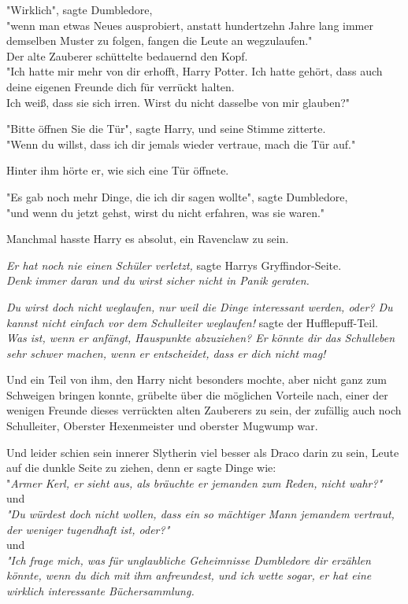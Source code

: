 {"Wirklich", sagte Dumbledore,\\ "wenn man etwas Neues ausprobiert, anstatt hundertzehn Jahre lang immer demselben Muster zu folgen, fangen die Leute an wegzulaufen."\\ Der alte Zauberer schüttelte bedauernd den Kopf.\\ "Ich hatte mir mehr von dir erhofft, Harry Potter. Ich hatte gehört, dass auch deine eigenen Freunde dich für verrückt halten.\\ Ich weiß, dass sie sich irren. Wirst du nicht dasselbe von mir glauben?"

"Bitte öffnen Sie die Tür", sagte Harry, und seine Stimme zitterte.\\ "Wenn du willst, dass ich dir jemals wieder vertraue, mach die Tür auf."

Hinter ihm hörte er, wie sich eine Tür öffnete.

"Es gab noch mehr Dinge, die ich dir sagen wollte", sagte Dumbledore,\\ "und wenn du jetzt gehst, wirst du nicht erfahren, was sie waren."

Manchmal hasste Harry es absolut, ein Ravenclaw zu sein.

\emph{Er hat noch nie einen Schüler verletzt,} sagte Harrys Gryffindor-Seite.\\ \emph{Denk immer daran und du wirst sicher nicht in Panik geraten.}

\emph{Du wirst doch nicht weglaufen, nur weil die Dinge interessant werden, oder? Du kannst nicht einfach vor dem Schulleiter weglaufen!} sagte der Hufflepuff-Teil.\\ \emph{Was ist, wenn er anfängt, Hauspunkte abzuziehen? Er könnte dir das Schulleben sehr schwer machen, wenn er entscheidet, dass er dich nicht mag!}

Und ein Teil von ihm, den Harry nicht besonders mochte, aber nicht ganz zum Schweigen bringen konnte, grübelte über die möglichen Vorteile nach, einer der wenigen Freunde dieses verrückten alten Zauberers zu sein, der zufällig auch noch Schulleiter, Oberster Hexenmeister und oberster Mugwump war.

Und leider schien sein innerer Slytherin viel besser als Draco darin zu sein, Leute auf die dunkle Seite zu ziehen, denn er sagte Dinge wie:\\ "\emph{Armer Kerl, er sieht aus, als bräuchte er jemanden zum Reden, nicht wahr?"}\\ und\\ \emph{"Du würdest doch nicht wollen, dass ein so mächtiger Mann jemandem vertraut, der weniger tugendhaft ist, oder?"}\\ und\\ \emph{"Ich frage mich, was für unglaubliche Geheimnisse Dumbledore dir erzählen könnte, wenn du dich mit ihm anfreundest, und ich wette sogar, er hat eine wirklich interessante Büchersammlung.}

}
